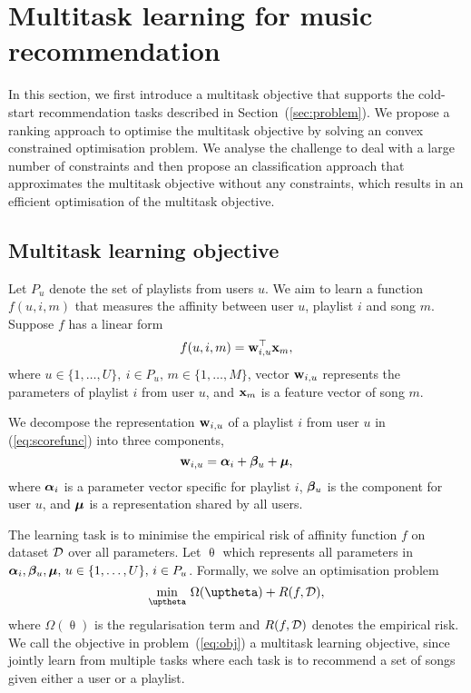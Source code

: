 \section{Multitask learning for music recommendation}
\label{sec:method}

In this section, we first introduce a multitask objective that supports the cold-start recommendation tasks
described in Section~(\ref{sec:problem}). We propose a ranking approach to optimise the multitask objective 
by solving an convex constrained optimisation problem.
We analyse the challenge to deal with a large number of constraints and then propose an classification approach
that approximates the multitask objective without any constraints, which results in an efficient optimisation of
the multitask objective.


\subsection{Multitask learning objective}

Let $P_u$ denote the set of playlists from users $u$.
We aim to learn a function $f(u, i, m)$ that measures the affinity between user $u$, 
playlist $i$ and song $m$. Suppose $f$ has a linear form
\begin{equation}
\label{eq:scorefunc}
f(u, i, m) = \mathbf{w}_{i,u}^\top \mathbf{x}_m,
\end{equation}
where $u \in \{1,\dots,U\}, \ i \in P_u, \, m \in \{1,\dots,M\}$,
vector $\mathbf{w}_{i,u}$ represents the parameters of playlist $i$ from user $u$,
and $\mathbf{x}_m$ is a feature vector of song $m$.

We decompose the representation $\mathbf{w}_{i,u}$ of a playlist $i$ from user $u$ in (\ref{eq:scorefunc}) into three components, \ie
$$
\mathbf{w}_{i,u} = {\bm{\alpha}}_i + {\bm{\beta}}_u + \bm{\mu},
$$
where ${\bm{\alpha}}_i$ is a parameter vector specific for playlist $i$,
${\bm{\beta}}_u$ is the component for user $u$,
and $\bm{\mu}$ is a representation shared by all users.

The learning task is to minimise the empirical risk of affinity function $f$ on dataset $\mathcal{D}$ over all parameters.
Let $\uptheta$ which represents all parameters in ${\bm{\alpha}}_i, {\bm{\beta}}_u, \bm{\mu}, \, u \in \{1,\dots,U\}, \, i \in P_u$.
Formally, we solve an optimisation problem
\begin{equation}
\label{eq:obj}
\min_{\uptheta} \, \Omega(\uptheta) + R(f, \DCal),
\end{equation}
where $\Omega(\uptheta)$ is the regularisation term and $R(f, \mathcal{D})$ denotes the empirical risk.
We call the objective in problem~(\ref{eq:obj}) a multitask learning objective,
since jointly learn from multiple tasks where each task is to recommend a set of songs given either a user or a playlist.

